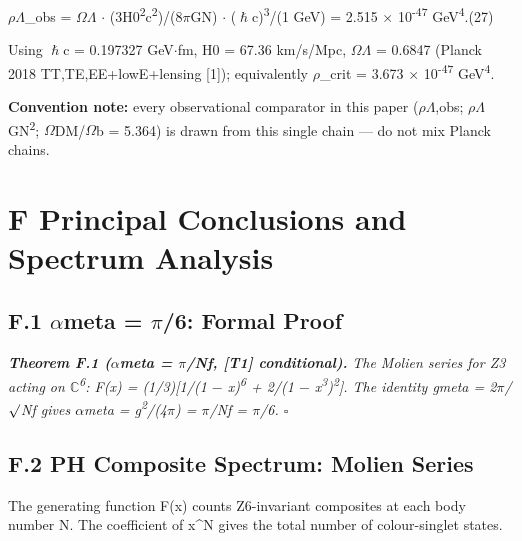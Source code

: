\documentclass[11pt,letterpaper]{article}
\begin{document}
\begingroup\centering $\rho$$\Lambda$\_obs = $\Omega$$\Lambda$ $\cdot$ (3H0\textsuperscript{2}c\textsuperscript{2})/(8$\pi$GN) $\cdot$ ($\hslash$c)\textsuperscript{3}/(1 GeV) = 2.515 $\times$ 10\textsuperscript{-47} GeV\textsuperscript{4}.\hspace{2em}(27)\par\endgroup

\noindent Using $\hslash$c = 0.197327 GeV$\cdot$fm, H0 = 67.36 km/s/Mpc, $\Omega$$\Lambda$ = 0.6847 (Planck 2018 TT,TE,EE+lowE+lensing [1]); equivalently $\rho$\_crit = 3.673 $\times$ 10\textsuperscript{-47} GeV\textsuperscript{4}.

\noindent \textbf{Convention note: }every observational comparator in this paper ($\rho$$\Lambda$,obs; $\rho$$\Lambda$GN\textsuperscript{2}; $\Omega$DM/$\Omega$b = 5.364) is drawn from this single chain --- do not mix Planck chains.

\section*{F  Principal Conclusions and Spectrum Analysis}

\subsection*{F.1  $\alpha$meta = $\pi$/6: Formal Proof}

\noindent \textbf{\textit{Theorem F.1 ($\alpha$meta = $\pi$/Nf, [T1] conditional). }}\textit{The Molien series for Z3 acting on $\mathbb{C}$\textsuperscript{6}: F(x) = (1/3)[1/(1 $-$ x)\textsuperscript{6} + 2/(1 $-$ x\textsuperscript{3})\textsuperscript{2}]. The identity gmeta = 2$\pi$/$\surd$Nf gives $\alpha$meta = g\textsuperscript{2}/(4$\pi$) = $\pi$/Nf = $\pi$/6. $\square$}

\subsection*{F.2  PH Composite Spectrum: Molien Series}

\noindent The generating function F(x) counts Z6-invariant composites at each body number N. The coefficient of x\textasciicircum{}N gives the total number of colour-singlet states.
\end{document}
